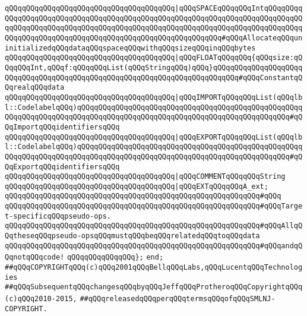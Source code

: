 \newline
\verb|qQQqqQQqqQQqqQQqqQQqqQQqqQQqqQQqqQQqqQQq|\verb#|qQQqSPACEqQQqqQQqIntqQQqqQQqqQQqqQQqqQQqqQQqqQQqqQQqqQQqqQQqqQQqqQQqqQQqqQQqqQQqqQQqqQQqqQQqqQQqqQQqqQQqqQQqqQQqqQQqqQQqqQQqqQQqqQQqqQQqqQQqqQQqqQQqqQQqqQQqqQQqqQQqqQQqqQQqqQQqqQQqqQQqqQQqqQQqqQQqqQQqqQQqqQQqqQQqqQQqqQQq#\verb|#qQQqAllocateqQQquninitializedqQQqdataqQQqspaceqQQqwithqQQqsizeqQQqinqQQqbytes|\newline
\newline
\verb|qQQqqQQqqQQqqQQqqQQqqQQqqQQqqQQqqQQqqQQq|\verb#|qQQqFLOATqQQqqQQq{qQQqsize:qQQqqQQqInt,qQQqf:qQQqqQQqList(qQQqStringqQQq)qQQq}qQQqqQQqqQQqqQQqqQQqqQQqqQQqqQQqqQQqqQQqqQQqqQQqqQQqqQQqqQQqqQQqqQQqqQQqqQQq#\verb|#qQQqConstantqQQqrealqQQqdata|\newline
\newline
\verb|qQQqqQQqqQQqqQQqqQQqqQQqqQQqqQQqqQQqqQQq|\verb#|qQQqIMPORTqQQqqQQqList(qQQqlbl::CodelabelqQQq)qQQqqQQqqQQqqQQqqQQqqQQqqQQqqQQqqQQqqQQqqQQqqQQqqQQqqQQqqQQqqQQqqQQqqQQqqQQqqQQqqQQqqQQqqQQqqQQqqQQqqQQqqQQqqQQqqQQqqQQq#\verb|#qQQqImportqQQqidentifiersqQQq|\newline
\verb|qQQqqQQqqQQqqQQqqQQqqQQqqQQqqQQqqQQqqQQq|\verb#|qQQqEXPORTqQQqqQQqList(qQQqlbl::CodelabelqQQq)qQQqqQQqqQQqqQQqqQQqqQQqqQQqqQQqqQQqqQQqqQQqqQQqqQQqqQQqqQQqqQQqqQQqqQQqqQQqqQQqqQQqqQQqqQQqqQQqqQQqqQQqqQQqqQQqqQQqqQQq#\verb|#qQQqExportqQQqidentifiersqQQq|\newline
\newline
\verb|qQQqqQQqqQQqqQQqqQQqqQQqqQQqqQQqqQQqqQQq|\verb#|qQQqCOMMENTqQQqqQQqString#\newline
\newline
\verb|qQQqqQQqqQQqqQQqqQQqqQQqqQQqqQQqqQQqqQQq|\verb#|qQQqEXTqQQqqQQqA_ext;#\newline
\verb|qQQqqQQqqQQqqQQqqQQqqQQqqQQqqQQqqQQqqQQqqQQqqQQqqQQqqQQqqQQq#qQQq|\newline
\verb|qQQqqQQqqQQqqQQqqQQqqQQqqQQqqQQqqQQqqQQqqQQqqQQqqQQqqQQqqQQq#qQQqTarget-specificqQQqpseudo-ops.|\newline
\verb|qQQqqQQqqQQqqQQqqQQqqQQqqQQqqQQqqQQqqQQqqQQqqQQqqQQqqQQqqQQq#qQQqAllqQQqtheseqQQqpseudo-opsqQQqmustqQQqbeqQQqrelatedqQQqtoqQQqdata|\newline
\verb|qQQqqQQqqQQqqQQqqQQqqQQqqQQqqQQqqQQqqQQqqQQqqQQqqQQqqQQqqQQq#qQQqandqQQqnotqQQqcode!|\newline
\verb|qQQqqQQqqQQqqQQq};|\newline
\verb|end;|\newline
\newline
\verb|##qQQqCOPYRIGHTqQQq(c)qQQq2001qQQqBellqQQqLabs,qQQqLucentqQQqTechnologies|\newline
\verb|##qQQqSubsequentqQQqchangesqQQqbyqQQqJeffqQQqProtheroqQQqCopyrightqQQq(c)qQQq2010-2015,|\newline
\verb|##qQQqreleasedqQQqperqQQqtermsqQQqofqQQqSMLNJ-COPYRIGHT.|\newline

